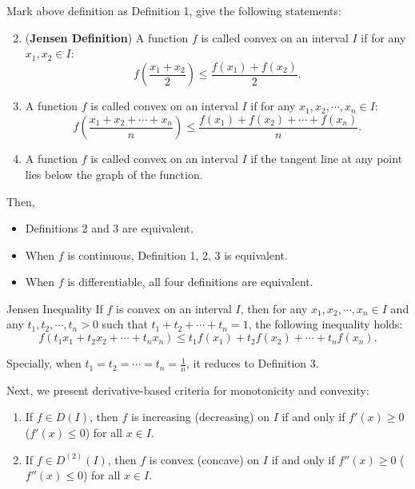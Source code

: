 \documentclass[11pt]{../../TexTemplate/elegantbook}
\begin{document}
\begin{theorem}
    Mark above definition as Definition 1, give the following statements:
    \begin{enumerate}
        \setcounter{enumi}{1} %
        \item (\textbf{Jensen Definition}) A function \(f\) is called convex on an interval \(I\) 
            if for any \(x_1, x_2 \in I\):
            \[
                f\left( \frac{x_1 + x_2}{2} \right) \leqslant \frac{f(x_1) + f(x_2)}{2}.
            \]
        \item A function \(f\) is called convex on an interval \(I\) 
            if for any \(x_1, x_2, \cdots, x_n \in I\):
            \[
                f\left( \frac{x_1 + x_2 + \cdots + x_n}{n} \right) \leqslant \frac{f(x_1) + f(x_2) + \cdots + f(x_n)}{n}.
            \]
        \item A function \(f\) is called convex on an interval \(I\) 
            if the tangent line at any point lies below the graph of the function.
    \end{enumerate}
    Then,
    \begin{itemize}
        \item Definitions 2 and 3 are equivalent. 
        \item When \(f\) is continuous, Definition 1, 2, 3 is equivalent.
        \item When \(f\) is differentiable, all four definitions are equivalent.
    \end{itemize}
\end{theorem}


\begin{theorem}{Jensen Inequality}
    If \(f\) is convex on an interval \(I\), 
    then for any \(x_1, x_2, \cdots, x_n \in I\) and any \(t_1, t_2, \cdots, t_n > 0\) 
    such that \(t_1 + t_2 + \cdots + t_n = 1\),
    the following inequality holds:
    \[
        f(t_1 x_1 + t_2 x_2 + \cdots + t_n x_n) \leqslant t_1 f(x_1) + t_2 f(x_2) + \cdots + t_n f(x_n).
    \]

    Specially, when \(t_1 = t_2 = \cdots = t_n = \frac{1}{n}\), it reduces to Definition 3.
\end{theorem}


Next, we present derivative-based criteria for monotonicity and convexity:
\begin{theorem}
    \begin{enumerate}
        \item If \(f \in D(I)\), then \(f\) is increasing (decreasing) on \(I\) 
            if and only if \(f'(x) \geq 0\) (\(f'(x) \leqslant 0\)) for all \(x \in I\). 
        \item If \(f \in D^{(2)}(I)\), then \(f\) is convex (concave) on \(I\) 
            if and only if \(f''(x) \geq 0\) (\(f''(x) \leqslant 0\)) for all \(x \in I\).
    \end{enumerate}
\end{theorem}
\end{document}
